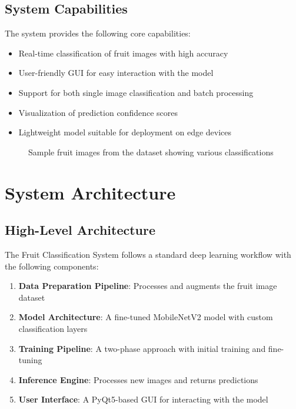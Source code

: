 \documentclass[11pt,a4paper]{report}
\begin{document}
\section{System Capabilities}
The system provides the following core capabilities:

\begin{itemize}
    \item Real-time classification of fruit images with high accuracy
    \item User-friendly GUI for easy interaction with the model
    \item Support for both single image classification and batch processing
    \item Visualization of prediction confidence scores
    \item Lightweight model suitable for deployment on edge devices
\end{itemize}

\begin{figure}[H]
    \centering
    \caption{Sample fruit images from the dataset showing various classifications}
    \label{fig:sample_images}
\end{figure}

\chapter{System Architecture}

\section{High-Level Architecture}
The Fruit Classification System follows a standard deep learning workflow with the following components:

\begin{enumerate}
    \item \textbf{Data Preparation Pipeline}: Processes and augments the fruit image dataset
    \item \textbf{Model Architecture}: A fine-tuned MobileNetV2 model with custom classification layers
    \item \textbf{Training Pipeline}: A two-phase approach with initial training and fine-tuning
    \item \textbf{Inference Engine}: Processes new images and returns predictions
    \item \textbf{User Interface}: A PyQt5-based GUI for interacting with the model
\end{enumerate}
\end{document}

